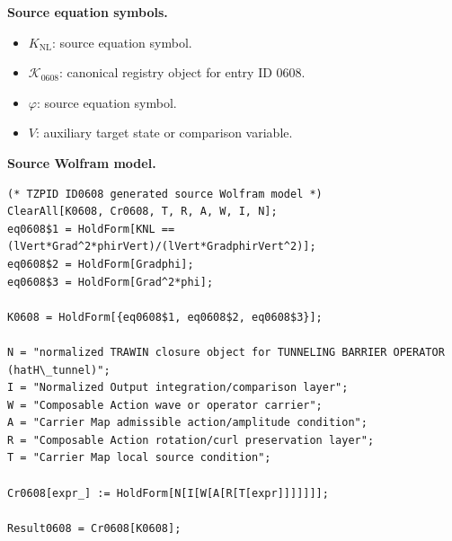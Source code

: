 \begin{minipage}[t]{0.49\linewidth}
\begingroup
\small
\raggedright
\textbf{Source equation symbols.}\par
\begin{itemize}[leftmargin=1.35em,itemsep=1pt,topsep=1pt,parsep=0pt]
    \item $K_{\mathrm{NL}}$: source equation symbol.
    \item $\mathcal{K}_{0608}$: canonical registry object for entry ID 0608.
    \item $\varphi$: source equation symbol.
    \item $V$: auxiliary target state or comparison variable.
\end{itemize}
\endgroup
\end{minipage}\hfill
\begin{minipage}[t]{0.47\linewidth}
\begingroup
\scriptsize
\raggedright
\textbf{Source Wolfram model.}\par
\begin{Verbatim}[fontsize=\tiny,breaklines=true,breakanywhere=true]
(* TZPID ID0608 generated source Wolfram model *)
ClearAll[K0608, Cr0608, T, R, A, W, I, N];
eq0608$1 = HoldForm[KNL == (lVert*Grad^2*phirVert)/(lVert*GradphirVert^2)];
eq0608$2 = HoldForm[Gradphi];
eq0608$3 = HoldForm[Grad^2*phi];

K0608 = HoldForm[{eq0608$1, eq0608$2, eq0608$3}];

N = "normalized TRAWIN closure object for TUNNELING BARRIER OPERATOR (hatH\_tunnel)";
I = "Normalized Output integration/comparison layer";
W = "Composable Action wave or operator carrier";
A = "Carrier Map admissible action/amplitude condition";
R = "Composable Action rotation/curl preservation layer";
T = "Carrier Map local source condition";

Cr0608[expr_] := HoldForm[N[I[W[A[R[T[expr]]]]]]];

Result0608 = Cr0608[K0608];
\end{Verbatim}
\endgroup
\end{minipage}

